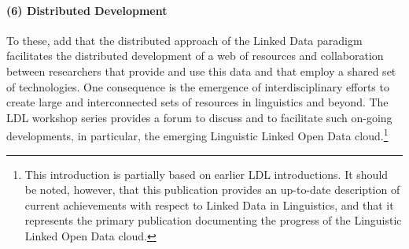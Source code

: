\smallskip\noindent
\paragraph{(6) Distributed Development}
To these, \citet{chiarcos-etal-2013-ldl-intro} add that the distributed approach of the Linked Data paradigm facilitates the distributed de\-ve\-lop\-ment of a web of resources and collaboration between researchers that provide and use this data and that employ a shared set of technologies. One consequence is the emergence of interdisciplinary efforts to create large and interconnected sets of resources in linguistics and beyond. The LDL workshop series provides a forum to discuss and to facilitate such on-going developments, in particular, the emerging Linguistic Linked Open Data cloud.\footnote{
	This introduction is partially based on earlier LDL introductions. 
	It should be noted, however, that this publication provides an up-to-date description of current achievements with respect to Linked Data in Linguistics, and that it represents the primary publication documenting the progress of the Linguistic Linked Open Data cloud.
}